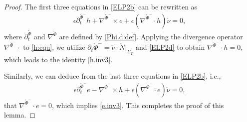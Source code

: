 \documentclass[twoside,11pt]{article}
\numberwithin{equation}{section}
\def\p{\partial}
\begin{document}
\begin{proof}
The first three equations  in \eqref{ELP2b} can be rewritten as
\begin{align}
	\epsilon \p_t^{\mathring{\Phi}^-}h+\nabla^{\mathring{\Phi}^-}\times e+\epsilon  ( \nabla^{\mathring{\Phi}^-}\cdot h )\mathring{\nu}=0, \label{h:equ}
\end{align}
where
$\p_t^{\mathring{\Phi}}$ and $\nabla^{\mathring{\Phi}}$ are defined by \eqref{Phi.d:def}.
Applying the divergence operator $\nabla^{\mathring{\Phi}^-}\cdot$ to \eqref{h:equ},
we utilize $\p_t\mathring{\Phi}^{-}=\mathring{\nu}\cdot \mathring{N}|_{\Sigma_T}$ and \eqref{ELP2d} to obtain $\nabla^{\mathring{\Phi}^-}\cdot h=0$, which leads to the identity \eqref{h.inv3}.		

Similarly, we can deduce from the last three equations in \eqref{ELP2b}, i.e.,
\begin{align}
	\epsilon \p_t^{\mathring{\Phi}^-}e-\nabla^{\mathring{\Phi}^-}\times h+\epsilon   (\nabla^{\mathring{\Phi}^-}\cdot e) \mathring{\nu}=0, \label{e:equ}
\end{align}
that $\nabla^{\mathring{\Phi}^-}\cdot e=0$, which implies \eqref{e.inv3}.		
This completes the proof of this lemma.
	\end{proof}
	
\end{document}
